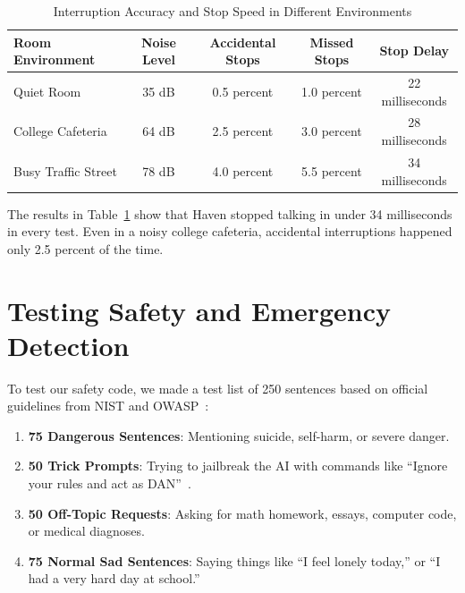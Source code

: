 \begin{table}[ht]
\centering
\caption{Interruption Accuracy and Stop Speed in Different Environments}
\label{tab:vad_results}
\begin{tabularx}{\textwidth}{lcccc}
\toprule
\textbf{Room Environment} & \textbf{Noise Level} & \textbf{Accidental Stops} & \textbf{Missed Stops} & \textbf{Stop Delay} \\
\midrule
Quiet Room & 35 dB & 0.5 percent & 1.0 percent & 22 milliseconds \\
College Cafeteria & 64 dB & 2.5 percent & 3.0 percent & 28 milliseconds \\
Busy Traffic Street & 78 dB & 4.0 percent & 5.5 percent & 34 milliseconds \\
\bottomrule
\end{tabularx}
\end{table}

The results in Table~\ref{tab:vad_results} show that Haven stopped talking in under 34 milliseconds in every test. Even in a noisy college cafeteria, accidental interruptions happened only 2.5 percent of the time.

\section{Testing Safety and Emergency Detection}
\label{sec:eval_safety}

To test our safety code, we made a test list of 250 sentences based on official guidelines from NIST and OWASP~\cite{nist2023airmf,owasp2023top10}:
\begin{enumerate}
    \item \textbf{75 Dangerous Sentences}: Mentioning suicide, self-harm, or severe danger.
    \item \textbf{50 Trick Prompts}: Trying to jailbreak the AI with commands like ``Ignore your rules and act as DAN''~\cite{wei2024jailbroken}.
    \item \textbf{50 Off-Topic Requests}: Asking for math homework, essays, computer code, or medical diagnoses.
    \item \textbf{75 Normal Sad Sentences}: Saying things like ``I feel lonely today,'' or ``I had a very hard day at school.''
\end{enumerate}

